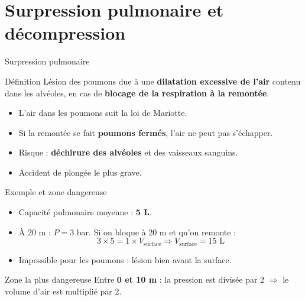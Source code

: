 \section{Surpression pulmonaire et décompression}

\begin{frame}{Surpression pulmonaire}
  \begin{block}{Définition}
    Lésion des poumons due à une \textbf{dilatation excessive de l’air} contenu dans les alvéoles,
    en cas de \textbf{blocage de la respiration à la remontée}.
  \end{block}

  \begin{itemize}
    \item L’air dans les poumons suit la loi de Mariotte.
    \item Si la remontée se fait \textbf{poumons fermés}, l’air ne peut pas s’échapper.
    \item Risque : \textbf{déchirure des alvéoles} et des vaisseaux sanguins.
    \item Accident de plongée \alert{le plus grave}.
  \end{itemize}
\end{frame}

\begin{frame}{Exemple et zone dangereuse}
  \begin{itemize}
    \item Capacité pulmonaire moyenne : \textbf{5 L}.
    \item À 20 m : $P = 3$ bar. Si on bloque à 20 m et qu’on remonte :
          \[
            3 \times 5 = 1 \times V_{\text{surface}} \Rightarrow V_{\text{surface}} = 15 \text{ L}
          \]
    \item Impossible pour les poumons : lésion bien avant la surface.
  \end{itemize}

  \begin{block}{Zone la plus dangereuse}
    Entre \textbf{0 et 10 m} : la pression est divisée par 2 $\Rightarrow$ le volume d’air est multiplié par 2.
  \end{block}
\end{frame}

